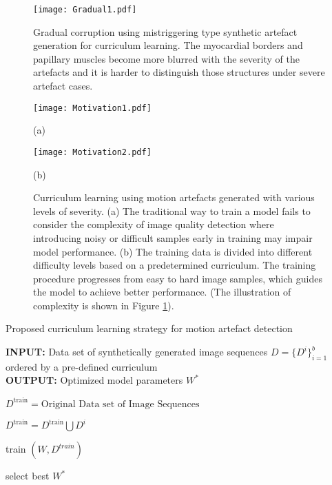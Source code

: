 \documentclass[preprint,12pt,authoryear]{elsarticle}
\begin{document}
 \begin{figure}[tb]
  \centering
  \centerline{\texttt{[image: Gradual1.pdf]}}
\caption{Gradual corruption using mistriggering type synthetic artefact generation for curriculum learning. The myocardial borders and papillary muscles become more blurred with the severity of the artefacts and it is harder to distinguish those structures under severe artefact cases.}
\label{fig:Gradual}
\end{figure}

 \begin{figure}[tb]

\begin{minipage}[b]{0.38\linewidth}
  \centering
  \centerline{\texttt{[image: Motivation1.pdf]}}
  \centerline{(a)}\medskip
\end{minipage}
\hfill
\begin{minipage}[b]{0.57\linewidth}
  \centering
  \centerline{\texttt{[image: Motivation2.pdf]}}
  \centerline{(b)}\medskip
\end{minipage}
\hfill


\caption{Curriculum learning using motion artefacts generated with various levels of severity. (a) The  traditional  way  to  train  a  model  fails  to consider  the  complexity  of  image quality detection  where  introducing  noisy  or  difficult  samples  early  in  training  may impair model performance. (b) The training data is divided into  different  difficulty  levels  based  on  a  predetermined curriculum. The training procedure progresses from easy to hard image  samples, which guides the model to achieve better performance.  (The  illustration  of  complexity  is  shown  in Figure \ref{fig:Gradual}).}
\label{fig:MotivationCur}
\end{figure}






\begin{algorithm}[t]
\caption{Proposed curriculum learning strategy for motion artefact detection}\label{alg:algo1}


\begin{flushleft}
        \textbf{INPUT:}  Data set of synthetically generated image sequences $D=\{ D^{i}\}^{b}_{i=1} $ ordered by a pre-defined curriculum \\
        \textbf{OUTPUT:} Optimized model parameters $W^{*}$
\end{flushleft}


\begin{algorithmic}[1]

\State $D^{\text{train}}= \text{Original Data set of Image Sequences}$


\State $D^{\text{train}}=D^{\text{train}} \bigcup D^{i}$


\State train $(W, D^{train})$
\EndFor

\State select best  $W^{*}$
\EndFor


\end{algorithmic}
\end{algorithm}
\end{document}
